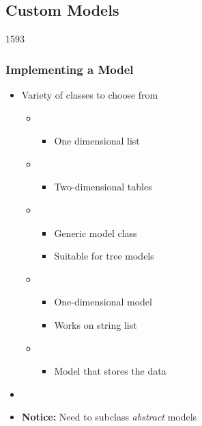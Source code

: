 %
%
%
%

\subsection{Custom Models}

\begin{slide}{1593}\frametitle{Implementing a Model}
\begin{itemize}
\item Variety of classes to choose from
  \begin{itemize}
  \item {}
    \begin{itemize}
    \item One dimensional list
    \end{itemize}
  \item {}
    \begin{itemize}
    \item Two-dimensional tables
    \end{itemize}
  \item {}
    \begin{itemize}
    \item Generic model class
    \item Suitable for tree models
    \end{itemize}
  \item {}
    \begin{itemize}
    \item One-dimensional model
    \item Works on string list
    \end{itemize}
  \item {}
    \begin{itemize}
    \item Model that stores the data
    \end{itemize}
 \end{itemize}
\item[]
\item \textbf{Notice:} Need to subclass \textit{abstract} models
\end{itemize}
\end{slide}


